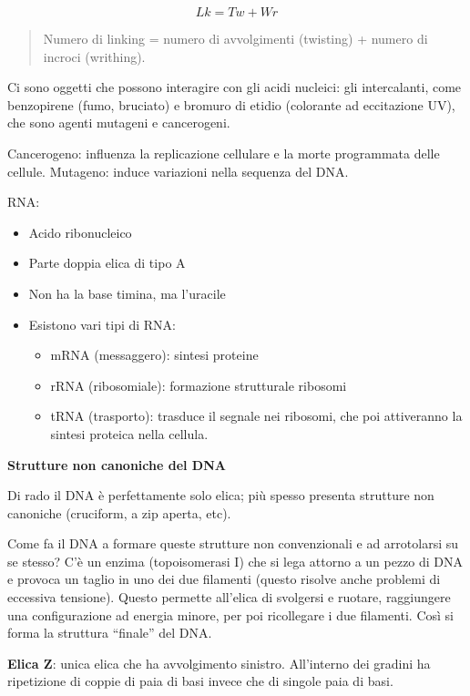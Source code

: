 \[Lk = Tw + Wr\]

\begin{quote}
Numero di linking = numero di avvolgimenti (twisting) + numero di
incroci (writhing).
\end{quote}

Ci sono oggetti che possono interagire con gli acidi nucleici: gli
intercalanti, come benzopirene (fumo, bruciato) e bromuro di etidio
(colorante ad eccitazione UV), che sono agenti mutageni e cancerogeni.

Cancerogeno: influenza la replicazione cellulare e la morte programmata
delle cellule. Mutageno: induce variazioni nella sequenza del DNA.

RNA:

\begin{itemize}
\item
  Acido ribonucleico
\item
  Parte doppia elica di tipo A
\item
  Non ha la base timina, ma l'uracile
\item
  Esistono vari tipi di RNA:

  \begin{itemize}
  \item
    mRNA (messaggero): sintesi proteine
  \item
    rRNA (ribosomiale): formazione strutturale ribosomi
  \item
    tRNA (trasporto): trasduce il segnale nei ribosomi, che poi
    attiveranno la sintesi proteica nella cellula.
  \end{itemize}
\end{itemize}

\textbf{Strutture non canoniche del DNA}

Di rado il DNA è perfettamente solo elica; più spesso presenta strutture
non canoniche (cruciform, a zip aperta, etc).

Come fa il DNA a formare queste strutture non convenzionali e ad
arrotolarsi su se stesso? C'è un enzima (topoisomerasi I) che si lega
attorno a un pezzo di DNA e provoca un taglio in uno dei due filamenti
(questo risolve anche problemi di eccessiva tensione). Questo permette
all'elica di svolgersi e ruotare, raggiungere una configurazione ad
energia minore, per poi ricollegare i due filamenti. Così si forma la
struttura ``finale'' del DNA.

\textbf{Elica Z}: unica elica che ha avvolgimento sinistro. All'interno
dei gradini ha ripetizione di coppie di paia di basi invece che di
singole paia di basi.

